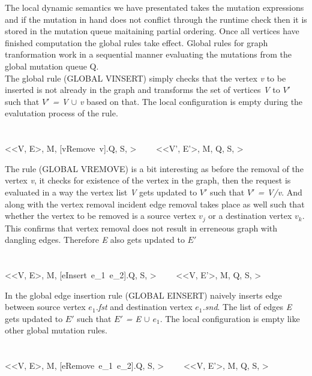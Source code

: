 \smallskip

The local dynamic semantics we have presentated takes the mutation expressions and if the mutation in hand does not conflict through the runtime check then it is stored in the mutation queue maitaining partial ordering. Once all vertices have finished computation the global rules take effect. Global rules for graph tranformation work in a sequential manner evaluating the mutations from the global mutation queue Q.\\
The global rule (GLOBAL VINSERT) simply checks that the vertex \emph{v} to be inserted is not already in the graph and transforms the set of vertices \emph{V} to \emph{$V'$} such that \emph{$V'$ = V $\cup$ v} based on that. The local configuration is empty during the evalutation process of the rule.\\
\\
\\
{<<V, E>, M, [vRemove\ v].Q, S, \bullet > \ \ \reducesto \ \ <<V', E'>, M, Q, S, \bullet >}

\smallskip
The rule (GLOBAL VREMOVE) is a bit interesting as before the removal of the vertex \emph{v}, it checks for existence of the vertex in the graph, then the request is evaluated in a way the vertex list \emph{V} gets updated to \emph{$V'$} such that \emph{$V'$ = V/v}. And along with the vertex removal incident edge removal takes place as well such that whether the vertex to be removed is a source vertex $v_j$ or a destination vertex $v_k$. This confirms that vertex removal does not result in erreneous graph with dangling edges. Therefore \emph{E} also gets updated to \emph{$E'$}\\
\ \\
\ \\
{<<V, E>, M, [eInsert\ e_1~e_2].Q, S, \bullet > \ \ \reducesto \ \ <<V, E'>, M, Q, S, \bullet >}

\smallskip
In the global edge insertion rule (GLOBAL EINSERT) naively inserts edge between source vertex \emph{$e_1$.fst} and destination vertex \emph{$e_1$.snd}. The list of edges \emph{E} gets updated to \emph{$E'$} such that \emph{$E'$ = E $\cup$ $e_1$}. The local configuration is empty like other global mutation rules.\\
\ \\
\ \\
{<<V, E>, M, [eRemove\ e_1~e_2].Q, S, \bullet > \ \ \reducesto \ \ <<V, E'>, M, Q, S, \bullet >}

